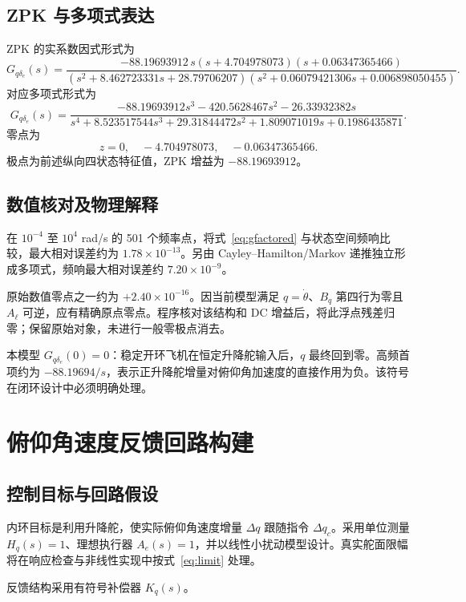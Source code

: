 \documentclass[UTF8,a4paper,11pt,fontset=windows]{ctexart}
\newcommand{\Gq}{G_{q\delta_e}}
\begin{document}
\subsection{ZPK 与多项式表达}
ZPK 的实系数因式形式为
\begin{equation}\label{eq:gfactored}
\boxed{\Gq(s)=\frac{-88.19693912\,s(s+4.704978073)(s+0.06347365466)}
{(s^2+8.462723331s+28.79706207)(s^2+0.06079421306s+0.006898050455)}.}
\end{equation}
对应多项式形式为
\begin{equation}
\Gq(s)=\frac{-88.19693912s^3-420.5628467s^2-26.33932382s}
{s^4+8.523517544s^3+29.31844472s^2+1.809071019s+0.1986435871}.
\end{equation}
零点为
\begin{equation}
z=0,\quad -4.704978073,\quad -0.06347365466.
\end{equation}
极点为前述纵向四状态特征值，ZPK 增益为 $-88.19693912$。

\subsection{数值核对及物理解释}
在 $10^{-4}$ 至 $10^4$ rad/s 的 501 个频率点，将式~\eqref{eq:gfactored} 与状态空间频响比较，最大相对误差约为 $1.78\times10^{-13}$。另由 Cayley--Hamilton/Markov 递推独立形成多项式，频响最大相对误差约 $7.20\times10^{-9}$。

原始数值零点之一约为 $+2.40\times10^{-16}$。因当前模型满足 $q=\dot\theta$、$B_q$ 第四行为零且 $A_\ell$ 可逆，应有精确原点零点。程序核对该结构和 DC 增益后，将此浮点残差归零；保留原始对象，未进行一般零极点消去。

本模型 $\Gq(0)=0$：稳定开环飞机在恒定升降舵输入后，$q$ 最终回到零。高频首项约为 $-88.19694/s$，表示正升降舵增量对俯仰角加速度的直接作用为负。该符号在闭环设计中必须明确处理。

\section{俯仰角速度反馈回路构建}\label{sec:loop}
\subsection{控制目标与回路假设}
内环目标是利用升降舵，使实际俯仰角速度增量 $\Delta q$ 跟随指令 $\Delta q_c$。采用单位测量 $H_q(s)=1$、理想执行器 $A_e(s)=1$，并以线性小扰动模型设计。真实舵面限幅将在响应检查与非线性实现中按式~\eqref{eq:limit} 处理。

反馈结构采用有符号补偿器 $K_q(s)$。
\end{document}
